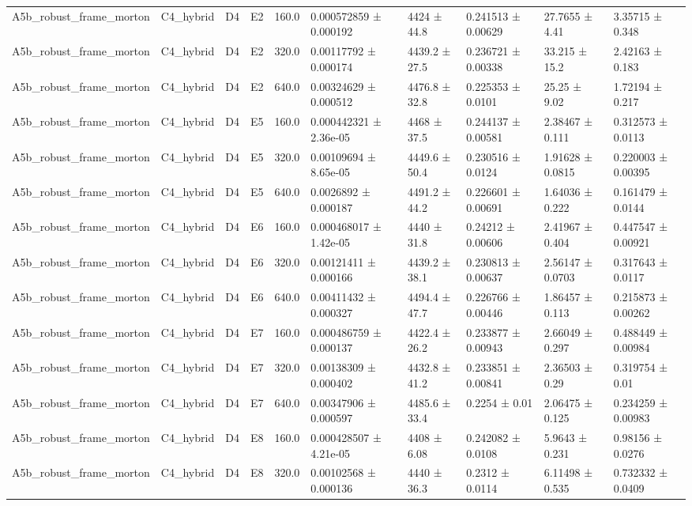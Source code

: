 \begin{table}
\begin{tabular}{llllllllll}
A5b\_robust\_frame\_morton & C4\_hybrid & D4 & E2 & 160.0 & 0.000572859 ± 0.000192 & 4424 ± 44.8 & 0.241513 ± 0.00629 & 27.7655 ± 4.41 & 3.35715 ± 0.348 \\
A5b\_robust\_frame\_morton & C4\_hybrid & D4 & E2 & 320.0 & 0.00117792 ± 0.000174 & 4439.2 ± 27.5 & 0.236721 ± 0.00338 & 33.215 ± 15.2 & 2.42163 ± 0.183 \\
A5b\_robust\_frame\_morton & C4\_hybrid & D4 & E2 & 640.0 & 0.00324629 ± 0.000512 & 4476.8 ± 32.8 & 0.225353 ± 0.0101 & 25.25 ± 9.02 & 1.72194 ± 0.217 \\
A5b\_robust\_frame\_morton & C4\_hybrid & D4 & E5 & 160.0 & 0.000442321 ± 2.36e-05 & 4468 ± 37.5 & 0.244137 ± 0.00581 & 2.38467 ± 0.111 & 0.312573 ± 0.0113 \\
A5b\_robust\_frame\_morton & C4\_hybrid & D4 & E5 & 320.0 & 0.00109694 ± 8.65e-05 & 4449.6 ± 50.4 & 0.230516 ± 0.0124 & 1.91628 ± 0.0815 & 0.220003 ± 0.00395 \\
A5b\_robust\_frame\_morton & C4\_hybrid & D4 & E5 & 640.0 & 0.0026892 ± 0.000187 & 4491.2 ± 44.2 & 0.226601 ± 0.00691 & 1.64036 ± 0.222 & 0.161479 ± 0.0144 \\
A5b\_robust\_frame\_morton & C4\_hybrid & D4 & E6 & 160.0 & 0.000468017 ± 1.42e-05 & 4440 ± 31.8 & 0.24212 ± 0.00606 & 2.41967 ± 0.404 & 0.447547 ± 0.00921 \\
A5b\_robust\_frame\_morton & C4\_hybrid & D4 & E6 & 320.0 & 0.00121411 ± 0.000166 & 4439.2 ± 38.1 & 0.230813 ± 0.00637 & 2.56147 ± 0.0703 & 0.317643 ± 0.0117 \\
A5b\_robust\_frame\_morton & C4\_hybrid & D4 & E6 & 640.0 & 0.00411432 ± 0.000327 & 4494.4 ± 47.7 & 0.226766 ± 0.00446 & 1.86457 ± 0.113 & 0.215873 ± 0.00262 \\
A5b\_robust\_frame\_morton & C4\_hybrid & D4 & E7 & 160.0 & 0.000486759 ± 0.000137 & 4422.4 ± 26.2 & 0.233877 ± 0.00943 & 2.66049 ± 0.297 & 0.488449 ± 0.00984 \\
A5b\_robust\_frame\_morton & C4\_hybrid & D4 & E7 & 320.0 & 0.00138309 ± 0.000402 & 4432.8 ± 41.2 & 0.233851 ± 0.00841 & 2.36503 ± 0.29 & 0.319754 ± 0.01 \\
A5b\_robust\_frame\_morton & C4\_hybrid & D4 & E7 & 640.0 & 0.00347906 ± 0.000597 & 4485.6 ± 33.4 & 0.2254 ± 0.01 & 2.06475 ± 0.125 & 0.234259 ± 0.00983 \\
A5b\_robust\_frame\_morton & C4\_hybrid & D4 & E8 & 160.0 & 0.000428507 ± 4.21e-05 & 4408 ± 6.08 & 0.242082 ± 0.0108 & 5.9643 ± 0.231 & 0.98156 ± 0.0276 \\
A5b\_robust\_frame\_morton & C4\_hybrid & D4 & E8 & 320.0 & 0.00102568 ± 0.000136 & 4440 ± 36.3 & 0.2312 ± 0.0114 & 6.11498 ± 0.535 & 0.732332 ± 0.0409 \\

\end{tabular}
\end{table}
